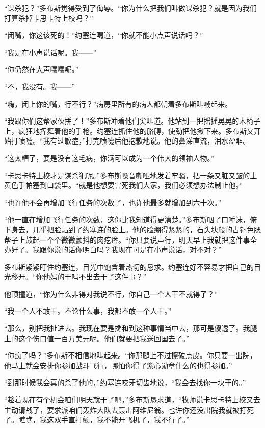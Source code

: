     “谋杀犯？”多布斯觉得受到了侮辱。“你为什么把我们叫做谋杀犯？就是因为我们打算杀掉卡思卡特上校吗？”

    “闭嘴，你这该死的！”约塞连喝道，“你就不能小点声说话吗？”

    “我是在小声说话呢。我——”

    “你仍然在大声嚷嚷呢。”

    “不，我没有。我——”

    “嗨，闭上你的嘴，行不行？”病房里所有的病人都朝着多布斯叫喊起来。

    “我跟你们这帮家伙拼了！”多布斯冲着他们尖叫道。他站到一把摇摇晃晃的木椅子上，疯狂地挥舞着他的手枪。约塞连抓住他的胳膊，使劲把他揪下来。多布斯又开始打喷嚏。“我有过敏症，”打完喷嚏后他抱歉地说。他的鼻涕直流，泪水盈眶。

    “这太糟了，要是没有这毛病，你满可以成为一个伟大的领袖人物。”

    “卡思卡特上校才是谋杀犯呢。”多布斯嗓音嘶哑地发着牢骚，把一条又脏又皱的土黄色手帕塞到口袋里。“就是他想要害死我们大家，我们必须想办法制止他。”

    “也许他不会再增加飞行任务的次数了，也许他最多就增加到六十次。”

    “他一直在增加飞行任务的次数，这你比我知道得更清楚。”多布斯咽了口唾沫，俯下身去，几乎把脸贴到了约塞连的脸上。他的脸绷得紧紧的，石头块般的古铜色腮帮子上鼓起一个个微微颤抖的肉疙瘩。“你只要说声行，明天早上我就把这件事全办好了。我跟你说的话你明白吗？我现在可是在小声说话，对不对？”

    多布斯紧紧盯住约塞连，目光中饱含着热切的恳求。约塞连好不容易才把自己的目光移开。“你他妈的干吗不出去干了这件事？”

    他顶撞道，“你为什么非得对我说不行，你自己一个人干不就得了？”

    “我一个人不敢干。不论什么事，我都不敢一个人干。”

    “那么，别把我扯进去。我现在要是搀和到这种事情当中去，那可是傻透了。我腿上的这个伤口值一百万美元呢。他们就要把我送回国去了。”

    “你疯了吗？”多布斯不相信地叫起来。“你那腿上不过擦破点皮。你只要一出院，他马上就会安排你参加战斗飞行，哪怕你得了紫心勋章什么的也得参加。”

    “到那时候我会真的杀了他的，”约塞连咬牙切齿地说，“我会去找你一块干的。”

    “趁着现在有个机会咱们明天就干了吧，”多布斯恳求道，“牧师说卡思卡特上校又去主动请战了，要求派咱们轰炸大队去轰击阿维尼翁。也许你还没出院我就被打死了。瞧瞧，我这双手直打颤，我不能开飞机了，我不行了。”

